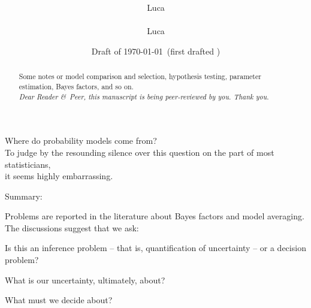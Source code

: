 \documentclass[\ifafour a4paper,12pt,\else a5paper,10pt,\fi%
onecolumn,oneside,article,%
british%
]{memoir}
\title{\propertitle%
}
\author{%
\ifpublic%
\hspace*{\stretch{1}}%
\parbox{0.5\linewidth}%
{\protect\centering Luca\\%
\footnotesize\epost{\email{piero.mana}{ntnu.no}}}%
\hspace*{\stretch{1}}%
\else%
Luca\\{\footnotesize\epost{\email{piero.mana}{ntnu.no}}%
}\fi%
}
\date{Draft of \today\ (first drafted \firstdraft)}
\theoremstyle{remark}
\theoremstyle{innote}
\newcommand*{\citep}{\parencites}
\newcommand*{\amp}{\&}
\newcommand*{\asudedication}[1]{%
{\par\centering\textit{#1}\par}}
\renewcommand*{\|}{\mathpunct{|}}
\begin{document}
\captiondelim{\quad}\captionnamefont{\footnotesize}\captiontitlefont{\footnotesize}
\frenchspacing

\maketitle
\ifpublic
\abstractrunin
\abslabeldelim{}
\renewcommand*{\abstractname}{}
\setlength{\absleftindent}{0pt}
\setlength{\absrightindent}{0pt}
\setlength{\abstitleskip}{-\absparindent}
\begin{abstract}%
  \noindent Some notes or model comparison and selection, hypothesis
  testing, parameter estimation, Bayes factors, and so on.
  \\\noindent\emph{\footnotesize Dear Reader \amp\ Peer, this manuscript is
    being peer-reviewed by you. Thank you.}
\end{abstract}\fi

\frenchspacing


 \setlength{\epigraphwidth}{.5\columnwidth}
 \epigraphfontsize{\footnotesize}
 \setlength{\epigraphrule}{0pt}
 \epigraph{Where do probability models come from?\\ To judge by the resounding
  silence over this question on the part of most statisticians,\\ it seems
  highly embarrassing.}{\citep[p.~220]{dawid1982}}


Summary:

Problems are reported in the literature about Bayes factors and model
averaging. The discussions suggest that we ask:
\begin{enumerate*}[(\arabic*)]
\item Is this an inference problem -- that is, quantification of
  uncertainty -- or a decision problem?
\item What is our uncertainty, ultimately, about?
\item What must we decide about?
\end{enumerate*}
\end{document}
